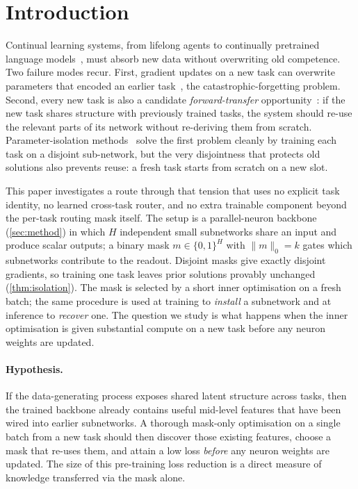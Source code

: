 \documentclass{article}
\theoremstyle{plain}
\theoremstyle{remark}
\begin{document}
\section{Introduction}
\label{sec:intro}

Continual learning systems, from lifelong agents to continually
pretrained language models~\citep{gururangan2020dontstop,
yildiz2024investigating}, must absorb new data without overwriting old
competence. Two failure modes recur. First, gradient updates on a new
task can overwrite parameters that encoded an earlier
task~\citep{mccloskey1989catastrophic, french1999catastrophic}, the
catastrophic-forgetting problem. Second, every new task is also a
candidate \emph{forward-transfer} opportunity~\citep{lopez2017gradient,
chaudhry2018efficient}: if the new task shares structure with previously
trained tasks, the system should re-use the relevant parts of its
network without re-deriving them from scratch. Parameter-isolation
methods~\citep{mallya2018packnet, serra2018overcoming,
wortsman2020supermasks} solve the first problem cleanly by training each
task on a disjoint sub-network, but the very disjointness that protects
old solutions also prevents reuse: a fresh task starts from scratch on a
new slot.

This paper investigates a route through that tension that uses no
explicit task identity, no learned cross-task router, and no extra
trainable component beyond the per-task routing mask itself. The setup
is a parallel-neuron backbone (\cref{sec:method}) in which $H$
independent small subnetworks share an input and produce scalar outputs;
a binary mask $m\in\{0,1\}^H$ with $\|m\|_0=k$ gates which subnetworks
contribute to the readout. Disjoint masks give exactly disjoint
gradients, so training one task leaves prior solutions provably
unchanged (\cref{thm:isolation}). The mask is selected by a short inner
optimisation on a fresh batch; the same procedure is used at training to
\emph{install} a subnetwork and at inference to \emph{recover} one. The
question we study is what happens when the inner optimisation is given
substantial compute on a new task before any neuron weights are
updated.

\paragraph{Hypothesis.}
If the data-generating process exposes shared latent structure across
tasks, then the trained backbone already contains useful mid-level
features that have been wired into earlier subnetworks. A thorough
mask-only optimisation on a single batch from a new task should then
discover those existing features, choose a mask that re-uses them, and
attain a low loss \emph{before} any neuron weights are updated. The
size of this pre-training loss reduction is a direct measure of
knowledge transferred via the mask alone.
\end{document}

